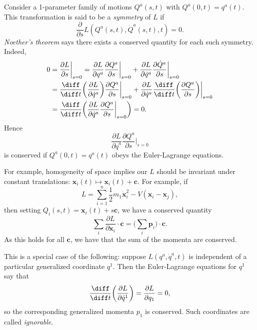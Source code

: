 \documentclass[12pt]{article}
\begin{document}
Consider a 1-parameter family of motions $Q^a(s, t)$ with $Q^a(0, t) = q^a(t)$. This transformation is said to be a \emph{symmetry} of $L$ if
\[
\frac{\partial}{\partial s} L (Q^a(s, t), \dot Q^a(s, t), t) = 0.
\]
\emph{Noether's theorem} says there exists a conserved quantity for each such symmetry. Indeed,
\begin{align*}
	0 &= \frac{\partial L}{\partial s} \biggr|_{s=0} = \frac{\partial L}{\partial q^a} \frac{\partial Q^a}{\partial s} \biggr|_{s = 0} + \frac{\partial L}{\partial \dot q^a}\frac{\partial \dot Q^a}{\partial s} \biggr|_{s = 0} \\
	  &= \frac{\diff}{\diff t} \biggl( \frac{\partial L}{\partial \dot q^a} \biggr) \frac{\partial Q^a}{\partial s} \biggr|_{s = 0} + \frac{\partial L}{\partial \dot q^a} \frac{\diff}{\diff t} \biggl(\frac{\partial Q^a}{\partial s} \biggr) \biggr|_{s = 0} \\
	  &= \frac{\diff}{\diff t} \biggl( \frac{\partial L}{\partial \dot q^a} \frac{\partial Q^a}{\partial s} \biggr|_{s = 0} \biggr) = 0.
\end{align*}
Hence
\[
\frac{\partial L}{\partial \dot q^a} \frac{\partial Q^a}{\partial s} \biggr|_{s = 0}
\]
is conserved if $Q^a(0, t) = q^a(t)$ obeys the Euler-Lagrange equations.


For example, homogeneity of space implies our $L$ should be invariant under constant translations: $\mathbf{x}_i(t) \mapsto \mathbf{x}_i(t) + \mathbf{c}$. For example, if
\[
L = \sum_{i = 1}^{n} \frac{1}{2} m_1 \mathbf{\dot x}_i^2 - V(\mathbf{x}_i - \mathbf{x}_j),
\]
then setting $Q_i(s, t) = \mathbf{x}_i(t) + s\mathbf{c}$, we have a conserved quantity
\[
\sum_{i} \frac{\partial L}{\partial \mathbf{\dot x}_i} \cdot \mathbf{c} = \Biggl( \sum_{i} \mathbf{p}_i \Biggr) \cdot \mathbf{c}.
\]
As this holds for all $\mathbf{c}$, we have that the sum of the momenta are conserved.

This is a special case of the following: suppose $L(q^a, \dot q^a, t)$ is independent of a particular generalized coordinate $q^1$. Then the Euler-Lagrange equations for $q^1$ say that
\[
\frac{\diff}{\diff t} \biggl( \frac{\partial L}{\partial \dot q^1} \biggr) = \frac{\partial L}{\partial q_1} = 0,
\]
so the corresponding generalized momenta $p_1$ is conserved. Such coordinates are called \emph{ignorable}.
\end{document}
